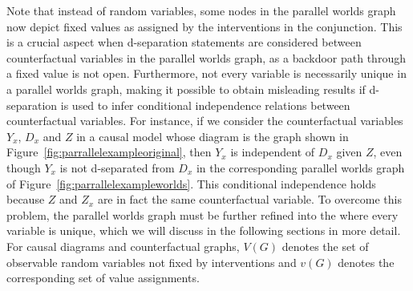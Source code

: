 Note that instead of random variables, some nodes in the parallel worlds graph now depict fixed values as assigned by the interventions in the conjunction. This is a crucial aspect when d-separation statements are considered between counterfactual variables in the parallel worlds graph, as a backdoor path through a fixed value is not open. Furthermore, not every variable is necessarily unique in a parallel worlds graph, making it possible to obtain misleading results if d-separation is used to infer conditional independence relations between counterfactual variables. For instance, if we consider the counterfactual variables \(Y_x\), \(D_x\) and \(Z\) in a causal model whose diagram is the graph shown in Figure~\ref{fig:parrallelexampleoriginal}, then \(Y_x\) is independent of \(D_x\) given \(Z\), even though \(Y_x\) is not d-separated from \(D_x\) in the corresponding parallel worlds graph of Figure~\ref{fig:parrallelexampleworlds}. This conditional independence holds because \(Z\) and \(Z_x\) are in fact the same counterfactual variable. To overcome this problem, the parallel worlds graph must be further refined into the  where every variable is unique, which we will discuss in the following sections in more detail. For causal diagrams and counterfactual graphs, \(V(G)\) denotes the set of observable random variables not fixed by interventions and \(v(G)\) denotes the corresponding set of value assignments.

